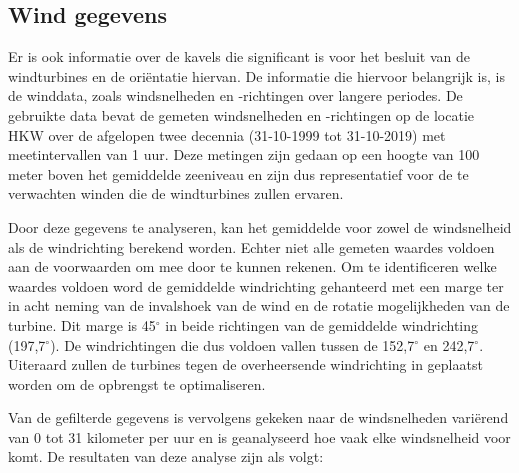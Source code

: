\subsection{Wind gegevens}
Er is ook informatie over de kavels die significant is voor het besluit van de windturbines en de oriëntatie hiervan. De informatie die hiervoor belangrijk is, is de winddata, zoals windsnelheden en -richtingen over langere periodes. De gebruikte data bevat de gemeten windsnelheden en -richtingen op de locatie HKW over de afgelopen twee decennia (31-10-1999 tot 31-10-2019) met meetintervallen van 1 uur.\cite{WindData} \cite{WindResourceAssessment} 
Deze metingen zijn gedaan op een hoogte van 100 meter boven het gemiddelde zeeniveau en zijn dus representatief voor de te verwachten winden die de windturbines zullen ervaren. 

Door deze gegevens te analyseren, kan het gemiddelde voor zowel de windsnelheid als de windrichting berekend worden. Echter niet alle gemeten waardes voldoen aan de voorwaarden om mee door te kunnen rekenen. Om te identificeren welke waardes voldoen word de gemiddelde windrichting gehanteerd met een marge ter in acht neming van de invalshoek van de wind en de rotatie mogelijkheden van de turbine. Dit marge is 45$^{\circ}$ in beide richtingen van de gemiddelde windrichting (197,7$^{\circ}$). De windrichtingen die dus voldoen vallen tussen de 152,7$^{\circ}$ en 242,7$^{\circ}$. Uiteraard zullen de turbines tegen de overheersende windrichting in geplaatst worden om de opbrengst te optimaliseren.

Van de gefilterde gegevens is vervolgens gekeken naar de windsnelheden variërend van 0 tot 31 kilometer per uur en is geanalyseerd hoe vaak elke windsnelheid voor komt. De resultaten van deze analyse zijn als volgt:

